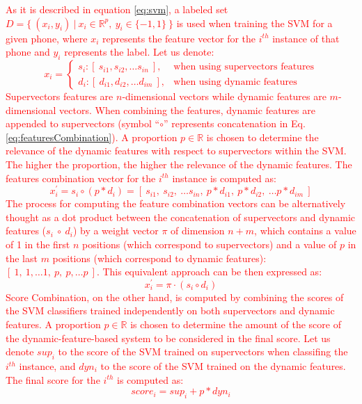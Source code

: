 \textcolor{red}{
	As it is described in equation \ref{eq:svm}, a labeled set
	\mbox{$D=\{ \ (x_{i}, y_{i}) \ | \ x_{i} \in \mathbb{R}^{p}, \ y_{i} \in \{-1, 1\} \ \}$}
	is used
	when training the SVM for a given phone, where $x_{i}$ represents the feature vector for the
	$i^{th}$ instance of that phone and $y_{i}$ represents the label.
	Let us denote:
	\begin{equation}
		x_{i} =
		\begin{cases}
			s_{i} : [ \ s_{i1}, s_{i2}, \dotsc s_{in} \ ], & \text{when using supervectors features} \\
			d_{i} : [ \ d_{i1}, d_{i2}, \dotsc d_{im} \ ], & \text{when using dynamic features}
		\end{cases}
	\end{equation}
	Supervectors features are $n$-dimensional vectors while dynamic features are $m$-dimensional
	vectors. When combining the features, dynamic features are appended to supervectors
	(symbol ``$\circ$'' represents concatenation in Eq. \ref{eq:featuresCombination}).
	A proportion $p \in \mathbb{R}$
	is chosen to determine the relevance of the dynamic features with respect to supervectors
	within the SVM. The higher the proportion, the higher the relevance of the dynamic features.
	The features combination vector for the $i^{th}$ instance is computed as:
	\begin{equation}
		x_{i}^{\prime} = s_{i} \circ (p * d_{i}) = [ \ s_{i1}, \ s_{i2}, \ \dotsc s_{in}, \ p * d_{i1}, \ p * d_{i2}, \ \dotsc p*d_{im} \ ]
		\label{eq:featuresCombination}
	\end{equation}
	The process for computing the feature combination vectors can be alternatively
	thought as a dot product between the concatenation of supervectors and dynamic features ($s_{i} \ \circ \ d_{i}$) by a weight vector $\pi$
	of dimension $n+m$, which contains a value of 1 in the first $n$ positions (which correspond to supervectors)
	and a value of $p$ in
	the last $m$ positions (which correspond to dynamic features): $[ \ 1, \ 1, \dotsc 1, \ p, \ p, \dotsc p \ ]$. This equivalent approach can be then expressed as:
	\begin{equation}
		x_{i}^{\prime} = \pi \cdot (s_{i} \circ d_{i})
	\end{equation}
	Score Combination, on the other hand, is computed by combining the scores
	of the SVM classifiers trained independently on both supervectors and dynamic features.
	A proportion $p \in \mathbb{R}$
	is chosen to determine the amount of the score of the dynamic-feature-based system to be considered
	in the final score. Let us denote $sup_{i}$ to the score of the
	SVM trained on supervectors when classifing the $i^{th}$ instance,
	and $dyn_{i}$ to the score of the SVM trained on the dynamic features. The final score for the
	$i^{th}$ is computed as:
	\begin{equation}
		score_{i} = sup_{i} + p * dyn_{i}
	\end{equation}
}
